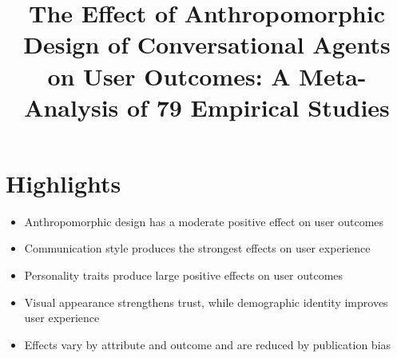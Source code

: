 \documentclass[preprint,10pt,authoryear,nonatbib]{elsarticle}
\begin{document}
\begin{frontmatter}


\title{The Effect of Anthropomorphic Design of Conversational Agents on User Outcomes: A Meta-Analysis of 79 Empirical Studies}

\end{frontmatter}

\section{Highlights}
\begin{itemize}
\item Anthropomorphic design has a moderate positive effect on user outcomes
\item Communication style produces the strongest effects on user experience
\item Personality traits produce large positive effects on user outcomes
\item Visual appearance strengthens trust, while demographic identity improves user experience
\item Effects vary by attribute and outcome and are reduced by publication bias
\end{itemize}
\end{document}
